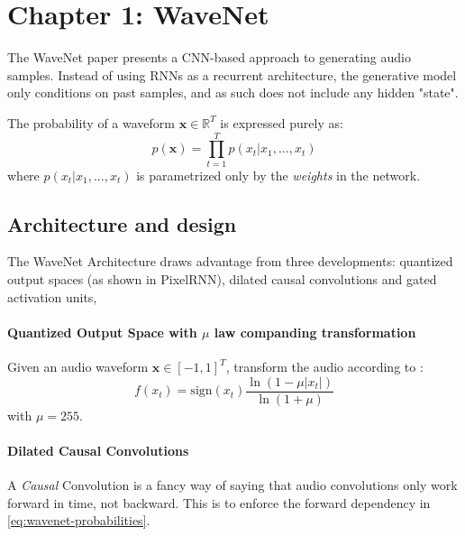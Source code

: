 \section{Chapter 1: WaveNet}
The WaveNet paper presents a CNN-based approach to generating audio samples. \cite{oord_wavenet_2016}
Instead of using RNNs as a recurrent architecture, the generative model only conditions on past samples, and as such does not include any hidden "state".

The probability of a waveform \(\mathbf{x}\in \mathbb{R}^T\) is expressed purely as:
\begin{equation}\label{eq:wavenet-probabilities}
    p(\mathbf{x}) = \prod_{t=1}^T  p(x_t | x_1, ..., x_t )
\end{equation}
where $ p(x_t | x_1, ..., x_t ) $ is parametrized only by the \textit{weights} in the network. 


\subsection{Architecture and design}
The WaveNet Architecture draws advantage from three developments: quantized output spaces (as shown in PixelRNN), dilated causal convolutions and gated activation units,

\paragraph{Quantized Output Space with $\mu$ law companding transformation}
Given an audio waveform \(\mathbf{x} \in [-1,1]^T\), transform the audio according to :
\begin{equation}
    f(x_t) = \textrm{sign}(x_t) \frac{ \ln(1 - \mu|x_t|  )}{ \ln(1 + \mu)  }
\end{equation} 
with \(\mu = 255\).


\paragraph{Dilated Causal Convolutions}
A \textit{Causal} Convolution is a fancy way of saying that audio convolutions only work forward in time, not backward.
This is to enforce the forward dependency in \cref{eq:wavenet-probabilities}.

